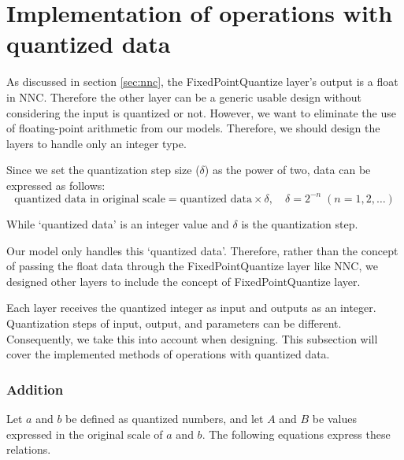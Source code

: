


\section{Implementation of operations with quantized data}\label{sec:implementation_operations}

As discussed in section \ref{sec:nnc}, the FixedPointQuantize layer's output is a float in NNC. Therefore the other layer can be a generic usable design without considering the input is quantized or not.
However, we want to eliminate the use of floating-point arithmetic from our models. Therefore, we should design the layers to handle only an integer type.

Since we set the quantization step size ($\delta$) as the power of two, data can be expressed as follows:
\[
\textrm{quantized data in original scale} = \textrm{quantized data} \times \delta, \quad \delta = 2^{-n} \; \left( n = 1, 2, \ldots\right)
\]

While `quantized data' is an integer value and $\delta$ is the quantization step.

Our model only handles this `quantized data'. Therefore, rather than the concept of passing the float data through the FixedPointQuantize layer like NNC, we designed other layers to include the concept of FixedPointQuantize layer.

Each layer receives the quantized integer as input and outputs as an integer. Quantization steps of input, output, and parameters can be different. Consequently, we take this into account when designing. This subsection will cover the implemented methods of operations with quantized data.


\subsubsection{Addition}
Let $a$ and $b$ be defined as quantized numbers, and let $A$ and $B$ be values expressed in the original scale of $a$ and $b$. The following equations express these relations.

